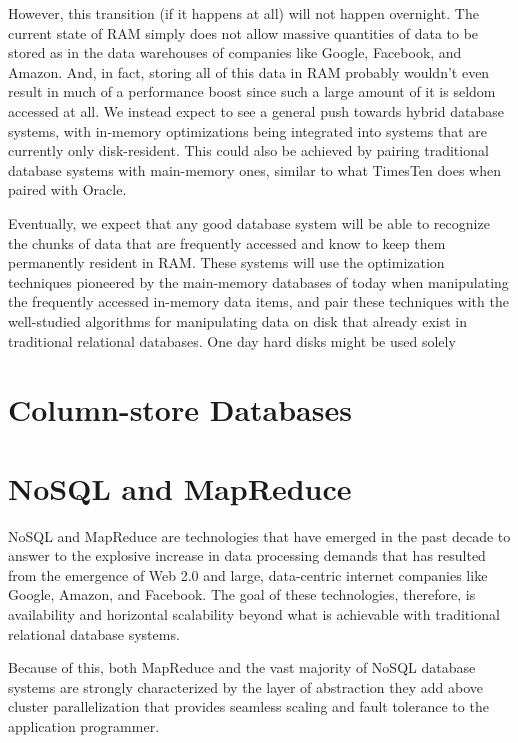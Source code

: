 \documentclass[11pt,a4paper]{report}
\begin{document}
However, this transition (if it happens at all) will not happen overnight. The current state of RAM simply does not allow massive quantities of data to be stored as in the data warehouses of companies like Google, Facebook, and Amazon. And, in fact, storing all of this data in RAM probably wouldn't even result in much of a performance boost since such a large amount of it is seldom accessed at all. We instead expect to see a general push towards hybrid database systems, with in-memory optimizations being integrated into systems that are currently only disk-resident. This could also be achieved by pairing traditional database systems with main-memory ones, similar to what TimesTen does when paired with Oracle. 

Eventually, we expect that any good database system will be able to recognize the chunks of data that are frequently accessed and know to keep them permanently resident in RAM. These systems will use the optimization techniques pioneered by the main-memory databases of today when manipulating the frequently accessed in-memory data items, and pair these techniques with the well-studied algorithms for manipulating data on disk that already exist in traditional relational databases. One day hard disks might be used solely 


\chapter{Column-store Databases}





\chapter{NoSQL and MapReduce}
NoSQL and MapReduce are technologies that have emerged in the past decade to answer to the explosive increase in data processing demands that has resulted from the emergence of Web 2.0 and large, data-centric internet companies like Google, Amazon, and Facebook.\cite{leavitt2010will} The goal of these technologies, therefore, is availability and horizontal scalability beyond what is achievable with traditional relational database systems.

Because of this, both MapReduce and the vast majority of NoSQL database systems are strongly characterized by the layer of abstraction they add above cluster parallelization that provides seamless scaling and fault tolerance to the application programmer. 
\end{document}
